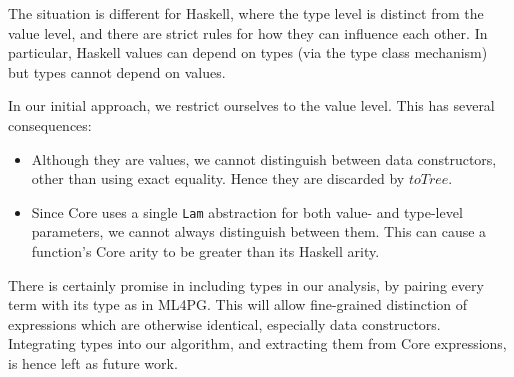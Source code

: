 The situation is different for Haskell, where the type level is distinct from the value level, and there are strict rules for how they can influence each other. In particular, Haskell values can depend on types (via the type class mechanism) but types cannot depend on values.

In our initial approach, we restrict ourselves to the value level. This has several consequences:

\begin{itemize}
  \item Although they are values, we cannot distinguish between data constructors, other than using exact equality. Hence they are discarded by $toTree$.
  \item Since Core uses a single \texttt{Lam} abstraction for both value- and type-level parameters, we cannot always distinguish between them. This can cause a function's Core arity to be greater than its Haskell arity.
\end{itemize}

There is certainly promise in including types in our analysis, by pairing every term with its type as in ML4PG. This will allow fine-grained distinction of expressions which are otherwise identical, especially data constructors. Integrating types into our algorithm, and extracting them from Core expressions, is hence left as future work.
